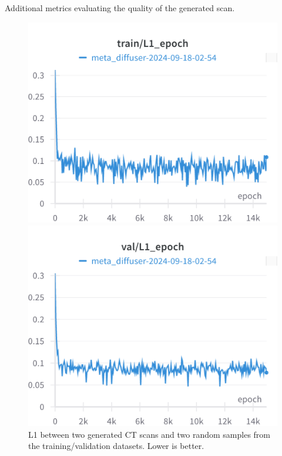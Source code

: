 Additional metrics evaluating the quality of the generated scan.
\begin{figure}[H]
\includegraphics[width=\linewidth]{detailed_engineering/Meta Diffusion/charts/train_l1_epoch.png}

\endminipage\hfill
{}
\includegraphics[width=\linewidth]{detailed_engineering/Meta Diffusion/charts/val_l1_epoch.png}

\endminipage
\caption{L1 between two generated CT scans and two random samples from the training/validation datasets. Lower is better.}
\end{figure}

